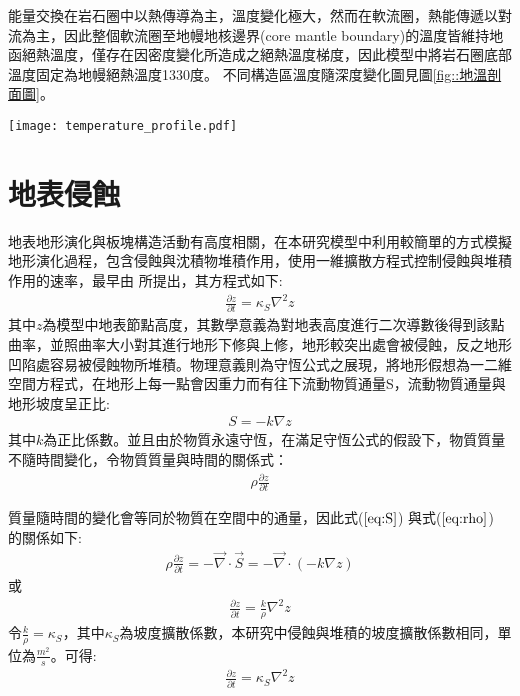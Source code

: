 能量交換在岩石圈中以熱傳導為主，溫度變化極大，然而在軟流圈，熱能傳遞以對流為主，因此整個軟流圈至地幔地核邊界(core mantle boundary)的溫度皆維持地函絕熱溫度，僅存在因密度變化所造成之絕熱溫度梯度，因此模型中將岩石圈底部溫度固定為地幔絕熱溫度1330度。
不同構造區溫度隨深度變化圖見圖\ref{fig::地溫剖面圖}。
\begin{figure*}[ht!]
    \centering
    \texttt{[image: temperature\_profile.pdf]}
    \caption[本研究使用之模型地溫剖面圖。]{本研究使用之模型地溫剖面圖，左圖為納茲卡模型，右圖為科科斯模型。藍色實線為海洋岩石圈地溫梯度，由式\ref{eq:Half Space Model}與海洋岩石圈年紀決定。咖啡色實線為大陸岩石圈地溫梯度，納茲卡模型大陸岩石圈為單層構造，科科斯模型大陸岩石圈為雙層構造。圖中並沒有考量絕熱地溫梯度。}
    \label{fig::地溫剖面圖}
\end{figure*}


\section{地表侵蝕}
地表地形演化與板塊構造活動有高度相關，在本研究模型中利用較簡單的方式模擬地形演化過程，包含侵蝕與沈積物堆積作用，使用一維擴散方程式控制侵蝕與堆積作用的速率，最早由\citealp{culling1960analytical} 所提出，其方程式如下:
\begin{align}
\frac{\partial z}{\partial t} = \kappa_S \nabla^2 z \label{eq:erosion}
\end{align}
其中$z$為模型中地表節點高度，其數學意義為對地表高度進行二次導數後得到該點曲率，並照曲率大小對其進行地形下修與上修，地形較突出處會被侵蝕，反之地形凹陷處容易被侵蝕物所堆積。物理意義則為守恆公式之展現，將地形假想為一二維空間方程式，在地形上每一點會因重力而有往下流動物質通量S，流動物質通量與地形坡度呈正比:
\begin{align}
S = -k\nabla z \label{eq:S}
\end{align}
其中$k$為正比係數。並且由於物質永遠守恆，在滿足守恆公式的假設下，物質質量不隨時間變化，令物質質量與時間的關係式：
\begin{align}
\rho\frac{\partial z}{\partial t}\label{eq:rho}
\end{align}

質量隨時間的變化會等同於物質在空間中的通量，因此式($\ref{eq:S}$) 與式($\ref{eq:rho}$) 的關係如下:
\begin{align}
\rho\frac{\partial z}{\partial t} = -\vec\nabla\cdot \vec S = -\vec\nabla \cdot (-k\nabla z)\label{eq:erosion2}
\end{align}
或
\begin{align}
\frac{\partial z}{\partial t} = \frac{k}{\rho}\nabla^2 z\label{eq:erosion3}
\end{align}
令$\frac{k}{\rho}=\kappa_S$，其中$\kappa_S$為坡度擴散係數，本研究中侵蝕與堆積的坡度擴散係數相同，單位為$\frac{m^2}{s}$。可得:
\begin{align}
\frac{\partial z}{\partial t} = \kappa_S\nabla^2 z\label{eq:erosion4}
\end{align}

